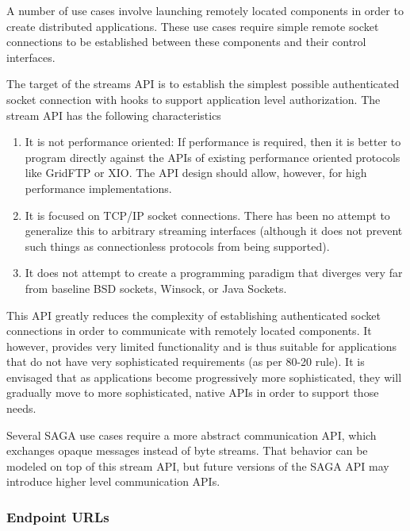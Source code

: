  
   A number of use cases involve launching  remotely located
   components in order to create distributed applications. These
   use cases require simple remote socket connections to be
   established between these components and their control
   interfaces.
 
   The target of the streams API is to establish the simplest
   possible authenticated socket connection with hooks to
   support application level authorization.  The stream API has
   the following characteristics
 
   \begin{enumerate}
 
     \item It is not performance oriented:  If performance is
     required, then it is better to program directly against the
     APIs of existing performance oriented protocols like
     GridFTP or XIO.  The API design should allow, however, for
     high performance implementations.
 
     \item It is focused on TCP/IP socket connections.  There
     has been no attempt to generalize this to arbitrary
     streaming interfaces (although it does not prevent such
     things as connectionless protocols from being supported).
 
     \item It does not attempt to create a programming paradigm
     that diverges very far from baseline BSD sockets, Winsock,
     or Java Sockets.
 
   \end{enumerate}
   
   This API greatly reduces the complexity of establishing
   authenticated socket connections in order to communicate with
   remotely located components.  It however, provides very
   limited functionality and is thus suitable for applications
   that do not have very sophisticated requirements (as per
   80-20 rule).  It is envisaged that as applications become
   progressively more sophisticated, they will gradually move to
   more  sophisticated, native APIs in order to support those
   needs.
 
   Several SAGA use cases require a more abstract communication
   API, which exchanges opaque messages instead of byte streams.
   That behavior can be modeled on top of this stream API, but
   future versions of the SAGA API may introduce higher level
   communication APIs.
 
   \subsubsection{Endpoint URLs}
 
